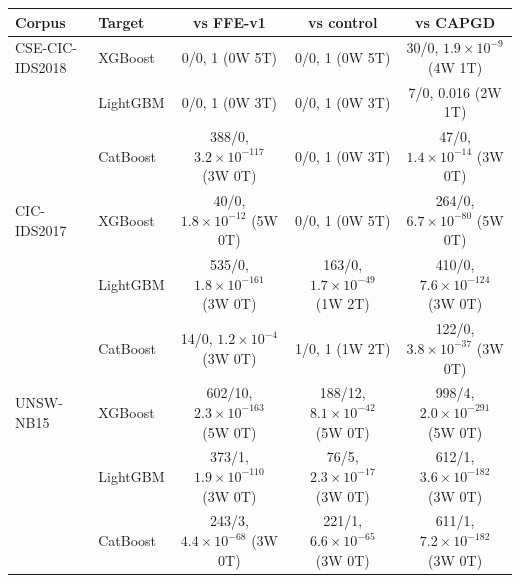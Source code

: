 \begin{tabular}{@{}llccc@{}}
\toprule
\textbf{Corpus} & \textbf{Target} & \textbf{vs FFE-v1} & \textbf{vs control} & \textbf{vs CAPGD} \\
\midrule
CSE-CIC-IDS2018 & XGBoost & 0/0, 1 (0W 5T) & 0/0, 1 (0W 5T) & 30/0, $1.9\times10^{-9}$ (4W 1T) \\
 & LightGBM & 0/0, 1 (0W 3T) & 0/0, 1 (0W 3T) & 7/0, 0.016 (2W 1T) \\
 & CatBoost & 388/0, $3.2\times10^{-117}$ (3W 0T) & 0/0, 1 (0W 3T) & 47/0, $1.4\times10^{-14}$ (3W 0T) \\
\midrule
CIC-IDS2017 & XGBoost & 40/0, $1.8\times10^{-12}$ (5W 0T) & 0/0, 1 (0W 5T) & 264/0, $6.7\times10^{-80}$ (5W 0T) \\
 & LightGBM & 535/0, $1.8\times10^{-161}$ (3W 0T) & 163/0, $1.7\times10^{-49}$ (1W 2T) & 410/0, $7.6\times10^{-124}$ (3W 0T) \\
 & CatBoost & 14/0, $1.2\times10^{-4}$ (3W 0T) & 1/0, 1 (1W 2T) & 122/0, $3.8\times10^{-37}$ (3W 0T) \\
\midrule
UNSW-NB15 & XGBoost & 602/10, $2.3\times10^{-163}$ (5W 0T) & 188/12, $8.1\times10^{-42}$ (5W 0T) & 998/4, $2.0\times10^{-291}$ (5W 0T) \\
 & LightGBM & 373/1, $1.9\times10^{-110}$ (3W 0T) & 76/5, $2.3\times10^{-17}$ (3W 0T) & 612/1, $3.6\times10^{-182}$ (3W 0T) \\
 & CatBoost & 243/3, $4.4\times10^{-68}$ (3W 0T) & 221/1, $6.6\times10^{-65}$ (3W 0T) & 611/1, $7.2\times10^{-182}$ (3W 0T) \\
\bottomrule
\end{tabular}
